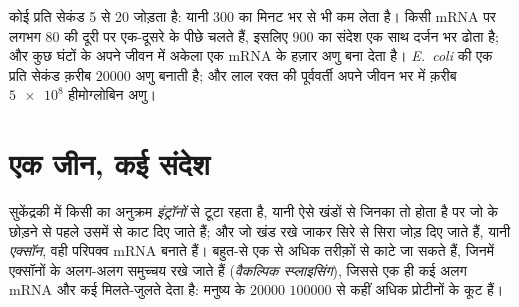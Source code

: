 \begin{example}[रफ़्तार और उपज]\label{ex:g11:gene-expression:speed}
कोई  प्रति सेकंड 5 से 20  जोड़ता है: यानी 300  का  मिनट भर से भी कम लेता है।  किसी mRNA पर लगभग 80
 की दूरी पर एक-दूसरे के पीछे चलते हैं, इसलिए 900
 का संदेश एक साथ दर्जन भर ढोता है; और कुछ घंटों के अपने
जीवन में अकेला एक mRNA  के हज़ार अणु बना देता है।
\emph{E.~coli} की एक  प्रति सेकंड क़रीब $\num{20000}$  अणु
बनाती है; और लाल रक्त  की पूर्ववर्ती अपने जीवन भर में क़रीब
$\num{5e8}$ हीमोग्लोबिन अणु।
\end{example}

\section{एक जीन, कई संदेश}

\begin{proposition}[सुकेंद्रकियों में संदेश का परिपक्व होना]\label{prop:g11:gene-expression:splicing}
सुकेंद्रकी  में किसी  का अनुक्रम \emph{इंट्रॉनों}
से टूटा रहता है, यानी ऐसे खंडों से जिनका  तो होता है पर जो  के
 छोड़ने से पहले उसमें से काट दिए जाते हैं; और जो खंड रखे जाकर सिरे
से सिरा जोड़ दिए जाते हैं, यानी \emph{एक्सॉन}, वही परिपक्व mRNA बनाते हैं।
बहुत-से  एक से अधिक तरीक़ों से काटे जा सकते हैं, जिनमें एक्सॉनों के
अलग-अलग समुच्चय रखे जाते हैं (\emph{वैकल्पिक स्प्लाइसिंग}), जिससे एक ही
 कई अलग mRNA और कई मिलते-जुलते  देता है: मनुष्य के $\num{20000}$
 $\num{100000}$ से कहीं अधिक प्रोटीनों के कूट हैं।
\end{proposition}
\admitted

